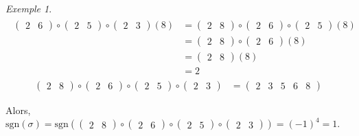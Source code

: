 \documentclass{report}
\theoremstyle{definition}
\theoremstyle{remark}
\newtheorem*{exem}{Exemple}
\begin{document}
\begin{exem}
\begin{align*}
\begin{split}
\begin{pmatrix}
					2&6
				\end{pmatrix} \circ \begin{pmatrix}
					2&5
				\end{pmatrix} \circ \begin{pmatrix}
					2&3
				\end{pmatrix}(8)&= \begin{pmatrix}
					2&8
				\end{pmatrix} \circ \begin{pmatrix}
					2&6
				\end{pmatrix} \circ \begin{pmatrix}
					2&5
				\end{pmatrix}(8)\\
				&= \begin{pmatrix}
					2&8
				\end{pmatrix} \circ \begin{pmatrix}
					2&6
				\end{pmatrix}(8)\\
				&= \begin{pmatrix}
					2&8
				\end{pmatrix}(8)\\
				&= 2
			\end{split}\tag{8}
		\end{align*}%
		\begin{align*}
		\begin{pmatrix}
			2&8
		\end{pmatrix} \circ \begin{pmatrix}
			2&6
		\end{pmatrix} \circ \begin{pmatrix}
			2&5
		\end{pmatrix} \circ \begin{pmatrix}
			2&3
		\end{pmatrix}&= \begin{pmatrix}
			2&3&5&6&8
		\end{pmatrix}
		\end{align*}

		Alors, $\mathrm{sgn}(\sigma) = \mathrm{sgn}\left( \begin{pmatrix}
			2&8
		\end{pmatrix} \circ \begin{pmatrix}
			2&6
		\end{pmatrix} \circ \begin{pmatrix}
			2&5
		\end{pmatrix} \circ \begin{pmatrix}
			2&3
		\end{pmatrix} \right) = (-1)^4 = 1$.
	\end{exem}
\end{document}
